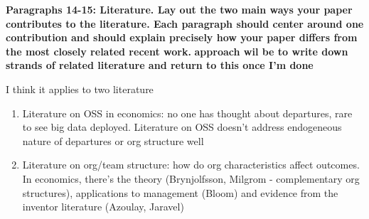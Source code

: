 \documentclass[12pt,notitlepage]{article}
\begin{document}
\textbf{Paragraphs 14-15: Literature. Lay out the two main ways your paper contributes to the literature. Each paragraph should center around one contribution and should explain precisely how your paper differs from the most closely related recent work.}
\textbf{approach wil be to write down strands of related literature and return to this once I'm done }

I think it applies to two literature
\begin{enumerate}
    \item Literature on OSS in economics: no one has thought about departures, rare to see big data deployed. Literature on OSS doesn't address endogeneous nature of departures or org structure well 
    \item Literature on org/team structure: how do org characteristics affect outcomes. In economics, there's the theory (Brynjolfsson, Milgrom - complementary org structures), applications to management (Bloom) and evidence from the inventor literature (Azoulay, Jaravel)
\end{enumerate}


\end{document}
